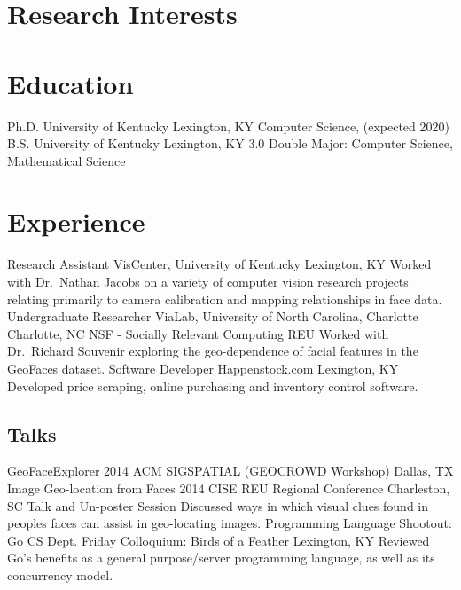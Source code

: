 \documentclass[10pt]{moderncv}
\begin{document}
\makecvtitle

\section{Research Interests}

\section{Education}
  {Ph.D.}
  {University of Kentucky}
  {Lexington, KY}
  {}
  {Computer Science, (expected 2020)}
  {B.S.}
  {University of Kentucky}
  {Lexington, KY}
  {3.0}
  {Double Major: Computer Science, Mathematical Science}

\section{Experience}
  {Research Assistant}
  {VisCenter, University of Kentucky}
  {Lexington, KY}
  {}
  {Worked with Dr.~Nathan Jacobs on a variety of computer vision
   research projects relating primarily to camera calibration and mapping
   relationships in face data.}
  {Undergraduate Researcher}
  {ViaLab, University of North Carolina, Charlotte}
  {Charlotte, NC}
  {NSF - Socially Relevant Computing REU}
  {Worked with Dr.~Richard Souvenir exploring the geo-dependence of
   facial features in the GeoFaces dataset.}
  {Software Developer}
  {Happenstock.com}
  {Lexington, KY}
  {}
  {Developed price scraping, online purchasing and inventory control
   software.}

\nocite{*}
\printbibliography[title={Publications}]

\subsection{Talks}
  {GeoFaceExplorer}
  {2014 ACM SIGSPATIAL (GEOCROWD Workshop)}
  {Dallas, TX}
  {}
  {}
  {Image Geo-location from Faces}
  {2014 CISE REU Regional Conference}
  {Charleston, SC}
  {Talk and Un-poster Session}
  {Discussed ways in which visual clues found in peoples faces can
   assist in geo-locating images.}
  {Programming Language Shootout: Go}
  {CS Dept. Friday Colloquium: Birds of a Feather}
  {Lexington, KY}
  {}
  {Reviewed Go's benefits as a general purpose/server programming
   language, as well as its concurrency model.}
\end{document}
